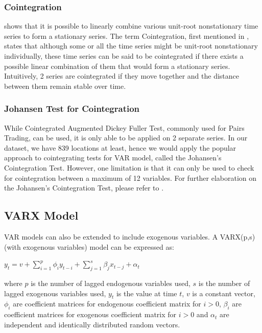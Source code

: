 \documentclass[10pt, letterpaper] {article}
\begin{document}
\subsubsection{Cointegration}
\cite{Box1977} shows that it is possible to linearly combine various unit-root nonstationary time series to form a stationary series. The term Cointegration, first mentioned in \cite{Granger1983}, states that although some or all the time series might be unit-root nonstationary individually, these time series can be said to be cointegrated if there exists a possible linear combination of them that would form a stationary series. Intuitively, 2 series are cointegrated if they move together and the distance between them remain stable over time. 

\subsubsection{Johansen Test for Cointegration}
While Cointegrated Augmented Dickey Fuller Test, commonly used for Pairs Trading, can be used, it is only able to be applied on 2 separate series. In our dataset, we have 839 locations at least, hence we would apply the popular approach to cointegrating tests for VAR model, called the Johansen's Cointegration Test. However, one limitation is that it can only be used to check for cointegration between a maximum of 12 variables. For further elaboration on the Johansen's Cointegration Test, please refer to \cite{Johansen1991}. 

\subsection{VARX Model}
VAR models can also be extended to include exogenous variables. A VARX(p,s) (with exogenous variables) model can be expressed as:

\begin{center}
    $\displaystyle y_t=v+\sum_{i=1}^{p} \phi_{i}y_{t-i}+\sum_{j=1}^{s} \beta_{j}x_{t-j}+\alpha_t$
\end{center}

\noindent where $p$ is the number of lagged endogenous variables used, $s$ is the number of lagged exogenous variables used, $y_t$ is the value at time $t$, $v$ is a constant vector, $\phi_i$ are coefficient matrices for endogenous coefficient matrix for $i>0$, $\beta_i$ are coefficient matrices for exogenous coefficient matrix for $i>0$ and $\alpha_t$ are independent and identically distributed random vectors. 
\end{document}
